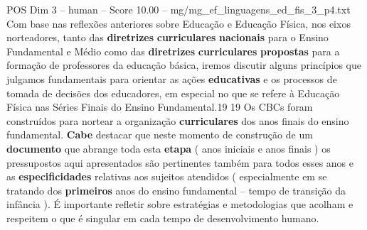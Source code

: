 \begin{textsample}{POS Dim 3 – human – Score 10.00 – mg/mg\_ef\_linguagens\_ed\_fis\_3\_p4.txt}  \label{ex:f3_pos_001}
Com base nas reflexões anteriores sobre Educação e Educação Física, nos eixos norteadores, tanto das \textbf{diretrizes} \textbf{curriculares} \textbf{nacionais} para o Ensino Fundamental e Médio como das \textbf{diretrizes} \textbf{curriculares} \textbf{propostas} para a formação de professores da educação básica, iremos discutir alguns princípios que julgamos fundamentais para orientar as ações \textbf{educativas} e os processos de tomada de decisões dos educadores, em especial no que se refere à Educação Física nas Séries Finais do Ensino Fundamental.19 19 Os CBCs foram construídos para nortear a organização \textbf{curriculares} dos anos finais do ensino fundamental. \textbf{Cabe} destacar que neste momento de construção de um \textbf{documento} que abrange toda esta \textbf{etapa} ( anos iniciais e anos finais ) os pressupostos aqui apresentados são pertinentes também para todos esses anos e as \textbf{especificidades} relativas aos sujeitos atendidos ( especialmente em se tratando dos \textbf{primeiros} anos do ensino fundamental – tempo de transição da infância ). É importante refletir sobre estratégias e metodologias que acolham e respeitem o que é singular em cada tempo de desenvolvimento humano.

\end{textsample}
